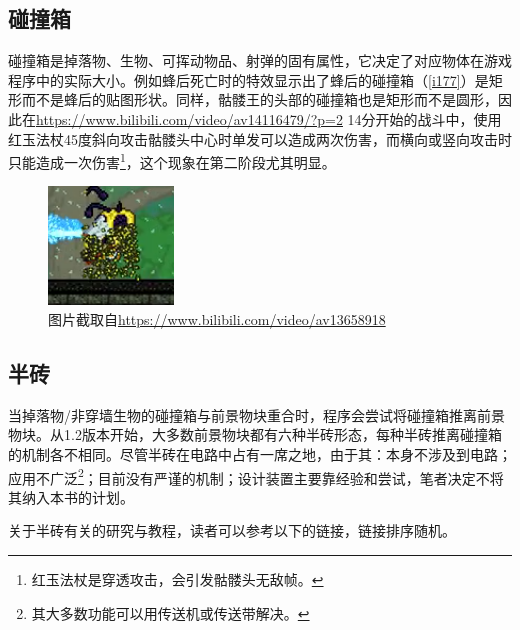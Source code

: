 \subsection{碰撞箱}

碰撞箱是掉落物、生物、可挥动物品、射弹的固有属性，它决定了对应物体在游戏程序中的实际大小。例如蜂后死亡时的特效显示出了蜂后的碰撞箱（\autoref{i177}）是矩形而不是蜂后的贴图形状。同样，骷髅王的头部的碰撞箱也是矩形而不是圆形，因此在\url{https://www.bilibili.com/video/av14116479/?p=2} 14分开始的战斗中，使用红玉法杖45度斜向攻击骷髅头中心时单发可以造成两次伤害，而横向或竖向攻击时只能造成一次伤害\footnote{红玉法杖是穿透攻击，会引发骷髅头无敌帧。}，这个现象在第二阶段尤其明显。

\begin{figure}[!h]
\centering
\includegraphics{images/177.png}
\caption{图片截取自\protect\url{https://www.bilibili.com/video/av13658918}}
\label{i177}
\end{figure}

\subsection{半砖}

当掉落物/非穿墙生物的碰撞箱与前景物块重合时，程序会尝试将碰撞箱推离前景物块。从1.2版本开始，大多数前景物块都有六种半砖形态，每种半砖推离碰撞箱的机制各不相同。尽管半砖在电路中占有一席之地，由于其：本身不涉及到电路；应用不广泛\footnote{其大多数功能可以用传送机或传送带解决。}；目前没有严谨的机制；设计装置主要靠经验和尝试，笔者决定不将其纳入本书的计划。

关于半砖有关的研究与教程，读者可以参考以下的链接，链接排序随机。

